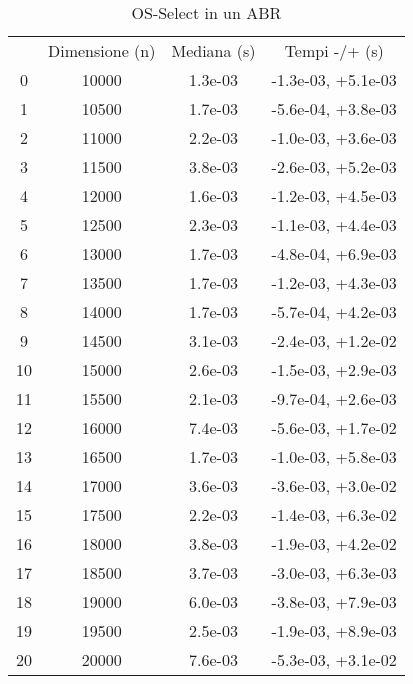 \begin{table}
\centering
\caption{OS-Select in un ABR}
\label{OS-Select in un ABR}
\begin{adjustbox}{width=1\textwidth/2}
\begin{tabular}{|c|c|c|c|}
\hline
 & Dimensione (n) & Mediana (s) & Tempi -/+ (s) \\
0 & 10000 & 1.3e-03 & -1.3e-03, +5.1e-03 \\
\cline{1-4}
1 & 10500 & 1.7e-03 & -5.6e-04, +3.8e-03 \\
\cline{1-4}
2 & 11000 & 2.2e-03 & -1.0e-03, +3.6e-03 \\
\cline{1-4}
3 & 11500 & 3.8e-03 & -2.6e-03, +5.2e-03 \\
\cline{1-4}
4 & 12000 & 1.6e-03 & -1.2e-03, +4.5e-03 \\
\cline{1-4}
5 & 12500 & 2.3e-03 & -1.1e-03, +4.4e-03 \\
\cline{1-4}
6 & 13000 & 1.7e-03 & -4.8e-04, +6.9e-03 \\
\cline{1-4}
7 & 13500 & 1.7e-03 & -1.2e-03, +4.3e-03 \\
\cline{1-4}
8 & 14000 & 1.7e-03 & -5.7e-04, +4.2e-03 \\
\cline{1-4}
9 & 14500 & 3.1e-03 & -2.4e-03, +1.2e-02 \\
\cline{1-4}
10 & 15000 & 2.6e-03 & -1.5e-03, +2.9e-03 \\
\cline{1-4}
11 & 15500 & 2.1e-03 & -9.7e-04, +2.6e-03 \\
\cline{1-4}
12 & 16000 & 7.4e-03 & -5.6e-03, +1.7e-02 \\
\cline{1-4}
13 & 16500 & 1.7e-03 & -1.0e-03, +5.8e-03 \\
\cline{1-4}
14 & 17000 & 3.6e-03 & -3.6e-03, +3.0e-02 \\
\cline{1-4}
15 & 17500 & 2.2e-03 & -1.4e-03, +6.3e-02 \\
\cline{1-4}
16 & 18000 & 3.8e-03 & -1.9e-03, +4.2e-02 \\
\cline{1-4}
17 & 18500 & 3.7e-03 & -3.0e-03, +6.3e-03 \\
\cline{1-4}
18 & 19000 & 6.0e-03 & -3.8e-03, +7.9e-03 \\
\cline{1-4}
19 & 19500 & 2.5e-03 & -1.9e-03, +8.9e-03 \\
\cline{1-4}
20 & 20000 & 7.6e-03 & -5.3e-03, +3.1e-02 \\
\cline{1-4}
\end{tabular}
\end{adjustbox}
\end{table}


